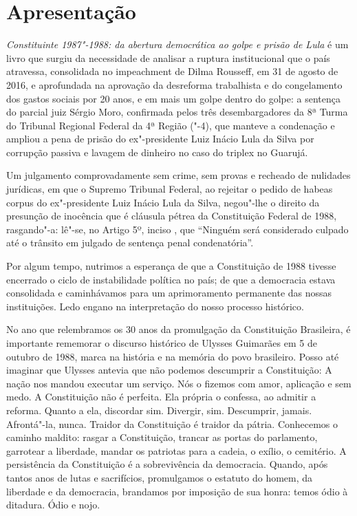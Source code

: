 \chapter{Apresentação}%

\emph{Constituinte 1987"-1988: da abertura democrática ao golpe e prisão de Lula} é um livro
que surgiu da necessidade de analisar a ruptura institucional que o país
atravessa, consolidada no impeachment de Dilma Rousseff, em 31 de agosto de
2016, e aprofundada na aprovação da desreforma
trabalhista e do congelamento dos gastos sociais por 20
anos, e em mais um golpe dentro do golpe: a sentença do parcial juiz Sérgio
Moro, confirmada pelos três desembargadores da 8ª Turma do Tribunal Regional Federal da
4ª Região ("-4), que manteve a condenação e ampliou
a pena de prisão do ex"-presidente Luiz Inácio Lula da Silva por corrupção passiva e lavagem
de dinheiro no caso do triplex no Guarujá.

Um julgamento comprovadamente sem crime, sem provas e recheado de nulidades jurídicas, em que
o Supremo Tribunal Federal, ao rejeitar o pedido de habeas corpus do ex"-presidente Luiz Inácio
Lula da Silva, negou"-lhe o direito da presunção de inocência que é cláusula
pétrea da Constituição Federal de 1988, rasgando"-a: lê"-se, no Artigo 5º, inciso
, que ``Ninguém será considerado culpado até o trânsito em julgado de sentença
penal condenatória''.

Por algum tempo, nutrimos a esperança de que a Constituição de 1988 tivesse encerrado
o ciclo de instabilidade política no país; de que a democracia
estava consolidada e caminhávamos para um aprimoramento
permanente das nossas instituições. Ledo engano na interpretação do
nosso processo histórico.

No ano que relembramos os 30 anos da promulgação da Constituição Brasileira,
é importante rememorar o discurso histórico de Ulysses Guimarães em 5 de
outubro de 1988, marca na história e na memória do povo brasileiro. Posso
até imaginar que Ulysses antevia que não podemos descumprir a Constituição:
A nação nos mandou executar um serviço. Nós o fizemos com amor, aplicação e sem medo. A
Constituição não é perfeita. Ela própria o confessa, ao admitir a reforma. Quanto a ela,
discordar sim. Divergir, sim. Descumprir, jamais. Afrontá"-la, nunca. Traidor da Constituição
é traidor da pátria. Conhecemos o caminho maldito: rasgar a Constituição, trancar as portas
do parlamento, garrotear a liberdade, mandar os patriotas para a cadeia, o exílio, o cemitério.
A persistência da Constituição é a sobrevivência da democracia. Quando, após tantos anos de
lutas e sacrifícios, promulgamos o estatuto do homem, da liberdade e da democracia, brandamos
por imposição de sua honra: temos ódio à ditadura. Ódio e nojo.

